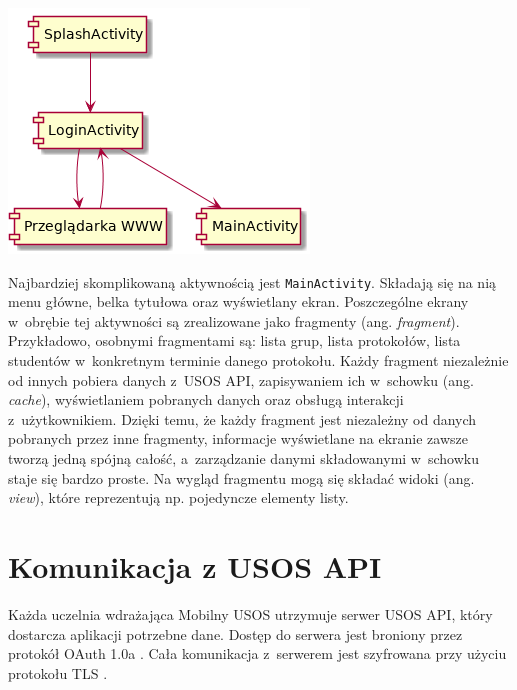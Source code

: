 \documentclass{pracamgr}
\begin{document}
\begingroup
\centering
\includegraphics[scale=0.7]{img/activities.png}
\label{fig:activities}
\medskip
\endgroup

Najbardziej skomplikowaną aktywnością jest \texttt{MainActivity}. Składają się na nią
menu główne, belka tytułowa oraz wyświetlany ekran. Poszczególne ekrany w~obrębie
tej aktywności są zrealizowane jako fragmenty (ang. \textit{fragment}). Przykładowo,
osobnymi fragmentami są: lista grup, lista protokołów, lista studentów w~konkretnym
terminie danego protokołu. Każdy fragment niezależnie od innych pobiera
danych z~USOS API, zapisywaniem ich w~schowku (ang. \textit{cache}),
wyświetlaniem pobranych danych oraz obsługą interakcji z~użytkownikiem. Dzięki temu,
że każdy fragment jest niezależny od danych pobranych przez inne fragmenty, informacje
wyświetlane na ekranie zawsze tworzą jedną spójną całość, a~zarządzanie danymi
składowanymi w~schowku staje się bardzo proste. Na wygląd fragmentu mogą się
składać widoki (ang. \textit{view}), które reprezentują np. pojedyncze elementy
listy.

\section{Komunikacja z USOS API}

Każda uczelnia wdrażająca Mobilny USOS utrzymuje serwer USOS API, który dostarcza
aplikacji potrzebne dane. Dostęp do serwera jest broniony przez protokół
OAuth 1.0a \cite{oauth}. Cała komunikacja z~serwerem jest szyfrowana przy użyciu
protokołu TLS \cite{tls12}.
\end{document}
